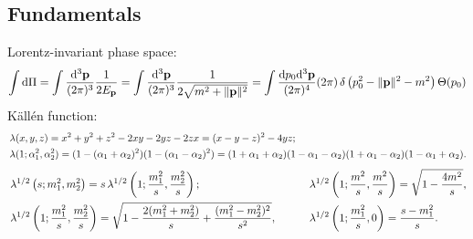 \documentclass[CheatSheet]{subfiles}
\begin{document}
\newpage

\detailstyle
\subsection{Fundamentals}
Lorentz-invariant phase space:
\begin{equation*}
\int\dd\Pi
= \int\ddP{p}\frac{1}{2E_{\vc p}}
= \int\ddP{p}\frac{1}{2\sqrt{m^2+\|\vc p\|^2}}
= \int\frac{\dd p_0\dd^3\vc p}{(2\pi)^4}(2\pi)\diracdelta\left(p_0^2-\|\vc p\|^2-m^2\right)\Theta(p_0)
\end{equation*}
K\"all\'en function:
\begin{align*}
&\Kallen(x,y,z)
= x^2+y^2+z^2-2xy-2yz-2zx
= (x-y-z)^2-4yz;
\\
&
\Kallen(1;\alpha_1^2,\alpha_2^2)
= (1-(\alpha_1+\alpha_2)^2)(1-(\alpha_1-\alpha_2)^2)
= (1+\alpha_1+\alpha_2)(1-\alpha_1-\alpha_2)(1+\alpha_1-\alpha_2)(1-\alpha_1+\alpha_2).
\end{align*}
\begin{alignat*}{2}
&\Kallen[1/2]\left(s;m_1^2, m_2^2\right) = s\Kallen[1/2]\left(1;\frac{m_1^2}{s}, \frac{m_2^2}{s}\right);&
\qquad
&\Kallen[1/2]\left(1;\frac{m^2}{s},\frac{m^2}{s}\right)
= \sqrt{1-\frac{4 m^2}{s}},\\
&\Kallen[1/2]\left(1;\frac{m_1^2}{s},\frac{m_2^2}{s}\right)
= \sqrt{1-\frac{2 (m_1^2+m_2^2)}{s}+\frac{(m_1^2-m_2^2)^2}{s^2}},&
&\Kallen[1/2]\left(1;\frac{m_1^2}{s},0\right)
= \frac{s-m_1^2}{s}.
\end{alignat*}
\end{document}
